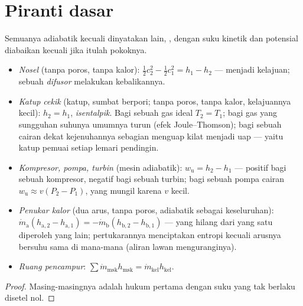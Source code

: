 \section{Piranti dasar}

\begin{proposition}\label{prop:b2:open-systems:devices}
Semuanya adiabatik kecuali dinyatakan lain, , dengan suku kinetik dan potensial
diabaikan kecuali jika itulah pokoknya.
\begin{itemize}
\item \emph{Nosel} (tanpa poros, tanpa kalor): $\tfrac12c_2^2 -
      \tfrac12c_1^2 = h_1 - h_2$ ---  menjadi kelajuan; sebuah
      \emph{difusor} melakukan kebalikannya.
\item \emph{Katup cekik} (katup, sumbat berpori; tanpa poros,
      tanpa kalor, kelajuannya kecil): $h_2 = h_1$, \emph{isentalpik}. Bagi sebuah
      gas ideal $T_2 = T_1$; bagi gas yang sungguhan suhunya umumnya
      turun (efek Joule--Thomson); bagi sebuah cairan dekat kejenuhannya
      sebagian menguap kilat menjadi uap --- yaitu katup pemuai setiap
      lemari pendingin.
\item \emph{Kompresor, pompa, turbin} (mesin
      adiabatik): $w_{\text{u}} = h_2 - h_1$ --- positif bagi sebuah kompresor,
      negatif bagi sebuah turbin; bagi sebuah pompa cairan $w_{\text{u}} \approx
      v(P_2 - P_1)$, yang mungil karena $v$ kecil.
\item \emph{Penukar kalor} (dua arus, tanpa
      poros, adiabatik sebagai keseluruhan): $\dot m_{\text{a}}(h_{\text{a},2} -
      h_{\text{a},1}) = -\dot m_{\text{b}}(h_{\text{b},2} - h_{\text{b},1})$
      --- yang hilang dari yang satu diperoleh yang lain; pertukarannya menciptakan entropi
      kecuali arusnya bersuhu sama di mana-mana
      (aliran lawan menguranginya).
\item \emph{Ruang pencampur}: $\sum\dot m_{\text{msk}}h_{\text{msk}} = \dot
      m_{\text{kel}}h_{\text{kel}}$.
\end{itemize}
\end{proposition}

\begin{proof}
Masing-masingnya adalah hukum pertama dengan suku yang tak berlaku disetel nol.
\end{proof}

